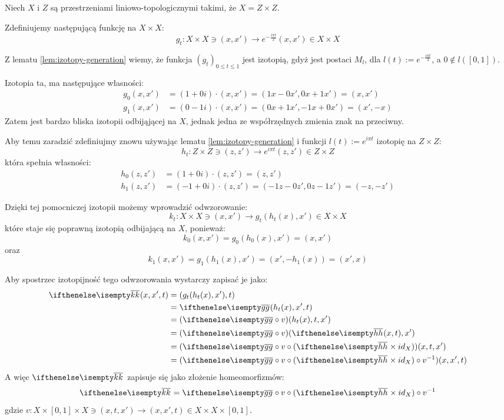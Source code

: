 \begin{ex}
  Niech $X$ i $Z$ są przestrzeniami liniowo-topologicznymi takimi, że $X = Z \times Z$.
  
  Zdefiniujemy następującą funkcję na $X \times X$:
  \[
    g_t: X \times X \ni (x,x') \to e^{-\frac{i \pi t}{2}} (x, x') \in X \times X
  \]
  
  Z lematu \ref{lem:izotopy-generation} wiemy, że funkcja $(g_t)_{0 \leq t \leq 1}$ jest izotopią, gdyż jest postaci $M_l$, dla $l(t) := e^{-\frac{i \pi t}{2}}$, a $0 \not\in l([0,1])$.
  
  Izotopia ta, ma następujące własności:
  \begin{align*}
    g_0(x,x') &= (1+0i) \cdot (x,x') = (1x-0x',0x+1x') = (x,x') \\
    g_1(x,x') &= (0-1i) \cdot (x,x') = (0x+1x',-1x+0x') = (x', -x)
  \end{align*}
  Zatem jest bardzo bliska izotopii odbijąjącej na $X$, jednak jedna ze współrzędnych zmienia znak na przeciwny.
  
  Aby temu zaradzić zdefiniujmy znowu używając lematu \ref{lem:izotopy-generation} i funkcji $l(t) := e^{i \pi t}$ izotopię na $Z \times Z$:
  \[
    h_t: Z \times Z \ni (z,z') \to e^{i \pi t}(z, z') \in Z \times Z
  \]
  która spełnia własności:
  \begin{align*}
    h_0(z,z') &= (1+0i) \cdot (z,z') = (z,z') \\
    h_1(z,z') &= (-1+0i) \cdot (z,z') = (-1z-0z', 0z-1z') = (-z,-z')
  \end{align*}
  
  Dzięki tej pomocniczej izotopii możemy wprowadzić odwzorowanie:
  \[k_t: X \times X \ni (x, x') \rightarrow g_t(h_t(x), x') \in X \times X\]
  które staje się poprawną izotopią odbijającą na $X$, ponieważ:
  \[k_0(x,x') = g_0(h_0(x), x') = (x, x')\]
  oraz
  \[k_1(x,x') = g_1(h_1(x), x') = (x', -h_1(x)) = (x', x)\]
  
  Aby spostrzec izotopijność tego odwzorowania wystarczy zapisać je jako:
  \begin{align*}
    \cl{k}(x,x',t) &= (g_t(h_t(x), x'), t) \\
    &= \cl{g}(h_t(x), x', t) \\
    &= (\cl{g} \circ v)(h_t(x), t, x') \\
    &= (\cl{g} \circ v)(\cl{h}(x,t), x') \\
    &= (\cl{g} \circ v \circ (\cl{h} \times id_X))(x,t,x') \\
    &= (\cl{g} \circ v \circ (\cl{h} \times id_X) \circ v^{-1})(x,x',t)
  \end{align*}
  A więc $\cl{k}$ zapisuje się jako złożenie homeomorfizmów:
  \[\cl{k} = \cl{g} \circ v \circ (\cl{h} \times id_X) \circ v^{-1}\]
  gdzie $v: X \times [0,1] \times X \ni (x, t, x') \rightarrow (x, x', t) \in X \times X \times [0,1]$.
  
\end{ex}

